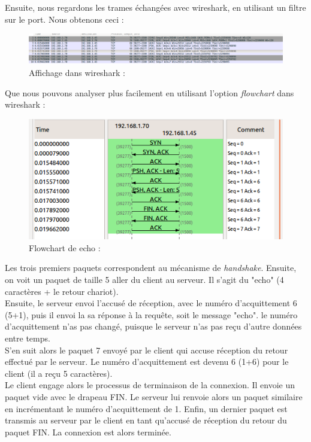 \documentclass[10pt,a4paper,final]{article}
\begin{document}
		Ensuite, nous regardons les trames échangées avec wireshark, en utilisant un filtre sur le port. Nous obtenons ceci :\\
		\begin{figure}[!h] 
			\centering
			\caption{Affichage dans wireshark :}
			\includegraphics[scale=0.3]{img/wireshark_echo.png} 
		\end{figure}		
		\newline
		Que nous pouvons analyser plus facilement en utilisant l'option \textit{\textrm{flowchart}} dans wireshark :\\
		\begin{figure}[!h] 
			\centering
			\caption{Flowchart de echo :}
			\includegraphics[scale=0.5]{img/flowchart_echo.png} 
		\end{figure}	
		\newline
		Les trois premiers paquets correspondent au mécanisme de \textit{\textrm{handshake}}. Ensuite, on voit un paquet de taille 5 aller du client au serveur. Il s'agit
		du "echo" (4 caractères + le retour chariot).\\
		\newline
		Ensuite, le serveur envoi l'accusé de réception, avec le numéro d'acquittement 6 (5+1), puis il envoi la sa réponse à la requête, soit le message "echo".
		le numéro d'acquittement n'as pas changé, puisque le serveur n'as pas reçu d'autre données entre temps. \\
		S’en suit alors le paquet 7 envoyé par le client qui accuse réception du retour effectué par le serveur. Le numéro d’acquittement est devenu 6 (1+6) pour le 
		client (il a reçu 5 caractères).\\
		\newline
		Le client engage alors le processus de terminaison de la connexion. Il envoie un paquet vide avec le drapeau FIN. Le serveur lui renvoie 
		alors un paquet similaire en incrémentant le numéro d’acquittement de 1. Enfin, un dernier paquet est transmis au serveur par le client en tant qu'accusé de 
		réception du retour du paquet FIN. La connexion est alors terminée.\\
		\newpage		
		
\end{document}
